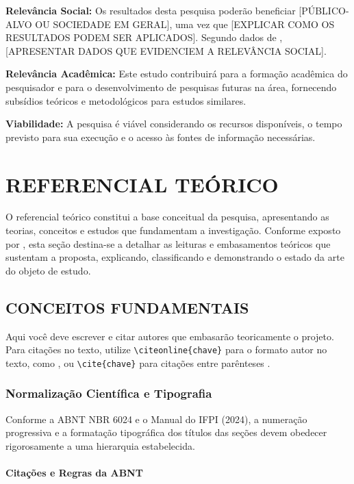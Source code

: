 \documentclass[
    12pt,        %
    openany,     %
    oneside,     %
    a4paper,     %
    english,     %
    brazil,      %
    article      %
]{abntex2}
\begin{document}
\textbf{Relevância Social:} Os resultados desta pesquisa poderão beneficiar [PÚBLICO-ALVO OU SOCIEDADE EM GERAL], uma vez que [EXPLICAR COMO OS RESULTADOS PODEM SER APLICADOS]. Segundo dados de \cite{instituicao2023}, [APRESENTAR DADOS QUE EVIDENCIEM A RELEVÂNCIA SOCIAL].

\textbf{Relevância Acadêmica:} Este estudo contribuirá para a formação acadêmica do pesquisador e para o desenvolvimento de pesquisas futuras na área, fornecendo subsídios teóricos e metodológicos para estudos similares.

\textbf{Viabilidade:} A pesquisa é viável considerando os recursos disponíveis, o tempo previsto para sua execução e o acesso às fontes de informação necessárias.


\section{REFERENCIAL TEÓRICO}
\label{sec:referencial}

O referencial teórico constitui a base conceitual da pesquisa, apresentando as teorias, conceitos e estudos que fundamentam a investigação. Conforme exposto por , esta seção destina-se a detalhar as leituras e embasamentos teóricos que sustentam a proposta, explicando, classificando e demonstrando o estado da arte do objeto de estudo.

\subsection{CONCEITOS FUNDAMENTAIS}
\label{subsec:fundamentacao1}

Aqui você deve escrever e citar autores que embasarão teoricamente o projeto. Para citações no texto, utilize \verb|\citeonline{chave}| para o formato autor no texto, como , ou \verb|\cite{chave}| para citações entre parênteses \cite{gil2019}.

\subsubsection{Normalização Científica e Tipografia}
\label{subsubsec:normalizacao}

Conforme a ABNT NBR 6024 e o Manual do IFPI (2024), a numeração progressiva e a formatação tipográfica dos títulos das seções devem obedecer rigorosamente a uma hierarquia estabelecida.

\paragraph{Citações e Regras da ABNT}
\label{para:citacoes}
\end{document}
